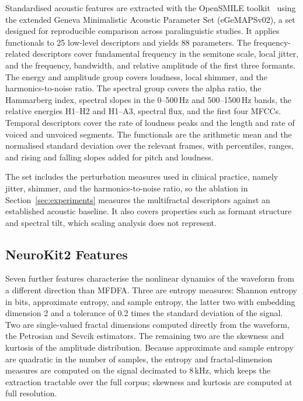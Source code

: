 \documentclass[runningheads]{llncs}
\begin{document}
  Standardised acoustic features are extracted with the OpenSMILE toolkit~\cite{opensmile} using the extended Geneva Minimalistic Acoustic Parameter Set (eGeMAPSv02), a set designed for reproducible comparison across paralinguistic studies. It applies functionals to 25 low-level descriptors and yields 88 parameters. The frequency-related descriptors cover fundamental frequency in the semitone scale, local jitter, and the frequency, bandwidth, and relative amplitude of the first three formants. The energy and amplitude group covers loudness, local shimmer, and the harmonics-to-noise ratio. The spectral group covers the alpha ratio, the Hammarberg index, spectral slopes in the 0--500\,Hz and 500--1500\,Hz bands, the relative energies H1--H2 and H1--A3, spectral flux, and the first four MFCCs. Temporal descriptors cover the rate of loudness peaks and the length and rate of voiced and unvoiced segments. The functionals are the arithmetic mean and the normalised standard deviation over the relevant frames, with percentiles, ranges, and rising and falling slopes added for pitch and loudness.

  The set includes the perturbation measures used in clinical practice, namely jitter, shimmer, and the harmonics-to-noise ratio, so the ablation in Section~\ref{sec:experiments} measures the multifractal descriptors against an established acoustic baseline. It also covers properties such as formant structure and spectral tilt, which scaling analysis does not represent.

  \subsection{NeuroKit2 Features}

  Seven further features characterise the nonlinear dynamics of the waveform from a different direction than MFDFA. Three are entropy measures: Shannon entropy in bits, approximate entropy, and sample entropy, the latter two with embedding dimension 2 and a tolerance of 0.2 times the standard deviation of the signal. Two are single-valued fractal dimensions computed directly from the waveform, the Petrosian and Sevcik estimators. The remaining two are the skewness and kurtosis of the amplitude distribution. Because approximate and sample entropy are quadratic in the number of samples, the entropy and fractal-dimension measures are computed on the signal decimated to 8\,kHz, which keeps the extraction tractable over the full corpus; skewness and kurtosis are computed at full resolution.
\end{document}
